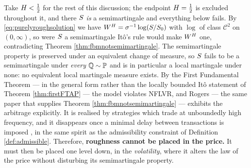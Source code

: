 


Take $H<\tfrac12$ for the rest of this discussion; the endpoint $H=\tfrac12$ is excluded
throughout it, and there $S$ \emph{is} a semimartingale and everything below fails.
By \eqref{eq:purelyroughsolution} we have $W^{H}=\sigma^{-1}\log(S/S_0)$ with $\log$ of class
$\mathcal{C}^{2}$ on $(0,\infty)$, so were $S$ a semimartingale Itô's rule would make $W^{H}$ one,
contradicting Theorem \ref{thm:fbmnotsemimartingale}. The semimartingale property is preserved under an
equivalent change of measure, so $S$ fails to be a semimartingale under \emph{every} $\mathbb{Q}\sim\mathbb{P}$
and is in particular a local martingale under none: no equivalent local martingale measure exists.
By the First Fundamental Theorem --- in the general form \cite[Thm.\ 7.2]{delbaenschachermayer1994}
rather than the locally bounded Itô statement of Theorem \ref{thm:firstFTAP} --- the model violates
NFLVR, and Rogers
\cite{rogers1997} --- the same paper that supplies Theorem \ref{thm:fbmnotsemimartingale} ---
exhibits the arbitrage explicitly. It is realised by strategies which trade at unboundedly high
frequency, and it disappears once a minimal delay between transactions is imposed
\cite{cheridito2003}, in the same spirit as the admissibility constraint of Definition
\ref{def:admissible}. Therefore, \textbf{roughness cannot be placed in the price.} It  must then be placed
one level down, in the \emph{volatility}, where it alters the law of the price without disturbing its
semimartingale property.

